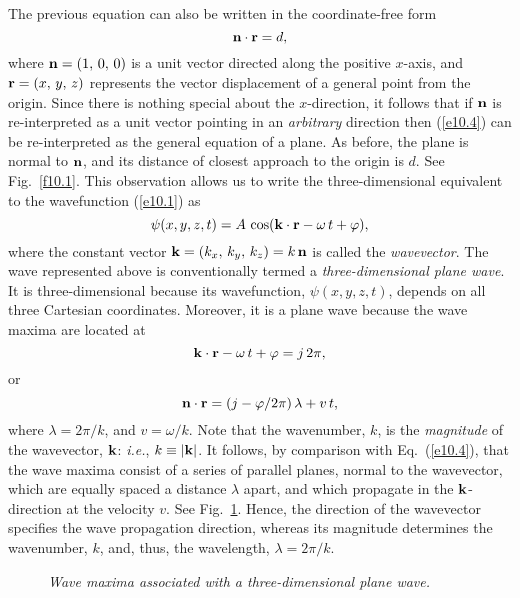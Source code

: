 The previous equation can also be written in the coordinate-free form
\begin{equation}\label{e10.4}
 {\bf n}\cdot{\bf r} = d,
\end{equation}
where  ${\bf n} = (1,\,0,\,0)$ is a unit
vector directed along the positive $x$-axis, and ${\bf r}=(x,\,y,\,z)$ represents the vector displacement of a general point from the origin. Since there is nothing special about the $x$-direction, it follows that if ${\bf n}$ is re-interpreted as a 
unit vector pointing in an {\em arbitrary}\/ direction then (\ref{e10.4}) can be re-interpreted as the general equation of a plane.
As before, the plane is normal to
${\bf n}$, and its distance of closest approach to the origin is $d$. See Fig.~\ref{f10.1}. This observation allows us to write the three-dimensional
equivalent to the wavefunction (\ref{e10.1}) as
\begin{equation}\label{e10.5}
\psi(x,y,z,t)=A\,\cos({\bf k}\cdot{\bf r}-\omega\,t+\varphi),
\end{equation}
where the constant vector ${\bf k} = (k_x,\,k_y,\,k_z)=k\,{\bf n}$ is called the {\em wavevector}. The  wave represented above is conventionally termed 
a {\em three-dimensional plane wave}. It is three-dimensio\-nal because its  wavefunction, $\psi(x,y,z,t)$, depends on all
three Cartesian coordinates. Moreover, it is a plane wave because the wave maxima are located at
\begin{equation}
{\bf k}\cdot{\bf r} -\omega\,t +\varphi= j\,2\pi,
\end{equation}
or
\begin{equation}
{\bf n}\cdot{\bf r} = (j-\varphi/2\pi)\,\lambda + v\,t,
\end{equation}
where  $\lambda=2\pi/k$,   and $v=\omega/k$. Note that the wavenumber, $k$, is the
{\em magnitude}\/ of the wavevector, ${\bf k}$: {\em i.e.}, $k\equiv |{\bf k}|$. 
It follows, by comparison with Eq.~(\ref{e10.4}), that the
wave maxima consist of a series of parallel planes,  normal to the wavevector, which are equally spaced a distance $\lambda$ apart, and which propagate in the ${\bf k}$-direction  at the velocity $v$. See Fig.~\ref{f10.2}. Hence, the direction of the wavevector specifies the  wave propagation direction, whereas its magnitude  determines the wavenumber, $k$, and, thus, the wavelength, $\lambda=2\pi/k$. 


\begin{figure}
\epsfysize=2.5in
\centerline{}
\caption{\em Wave maxima associated with a three-dimensional plane wave.}\label{f10.2}   
\end{figure}

